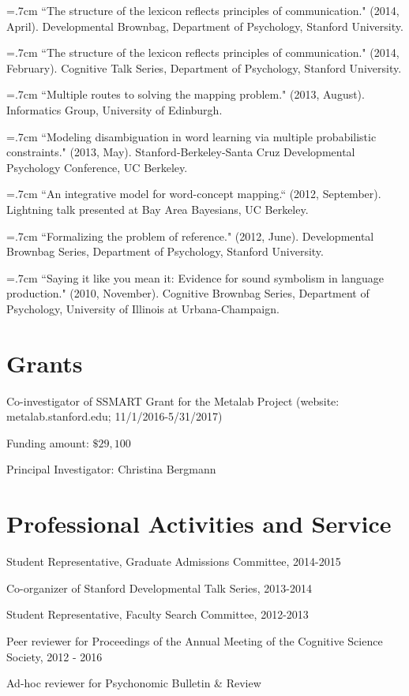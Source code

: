 \documentclass[letterpaper]{article}
\renewenvironment{itemize}{
  \begin{list}{}{
    \setlength{\leftmargin}{1.5em}
  }
}{
  \end{list}
}
\begin{document}
\hangindent=.7cm ``The structure of the lexicon reflects principles of communication." (2014, April). Developmental Brownbag, Department of Psychology, Stanford University.

\hangindent=.7cm ``The structure of the lexicon reflects principles of communication." (2014, February). Cognitive Talk Series, Department of Psychology, Stanford University.

\hangindent=.7cm ``Multiple routes to solving the mapping problem." (2013, August). Informatics Group, University of Edinburgh.
 
\hangindent=.7cm ``Modeling disambiguation in word learning via multiple probabilistic constraints." (2013, May). Stanford-Berkeley-Santa Cruz Developmental Psychology Conference, UC Berkeley.

 \hangindent=.7cm ``An integrative model for word-concept mapping.`` (2012, September). Lightning talk presented at Bay Area Bayesians, UC Berkeley.

\hangindent=.7cm ``Formalizing the problem of reference."  (2012, June). Developmental Brownbag Series, Department of Psychology, Stanford University.

\hangindent=.7cm ``Saying it like you mean it: Evidence for sound symbolism in language production." (2010, November). Cognitive Brownbag Series, Department of Psychology, University of Illinois at Urbana-Champaign.

 
 
 \singlespacing
 
 \section*{Grants}
\begin{itemize}
\item Co-investigator of SSMART Grant for the Metalab Project (website: metalab.stanford.edu; 11/1/2016-5/31/2017)
  \begin{itemize}
  	\item Funding amount: $\$29,100$ 
  	\item Principal Investigator: Christina Bergmann
   \end{itemize}
\end{itemize}

\section*{Professional Activities and Service}
\begin{itemize}
\item Student Representative, Graduate Admissions Committee, 2014-2015
\item  Co-organizer of Stanford Developmental Talk Series, 2013-2014
\item Student Representative, Faculty Search Committee, 2012-2013
\item Peer reviewer for Proceedings of the Annual Meeting of the Cognitive Science Society, 2012 -  2016
\item Ad-hoc reviewer for Psychonomic Bulletin \& Review 
\end{itemize}
\end{document}
